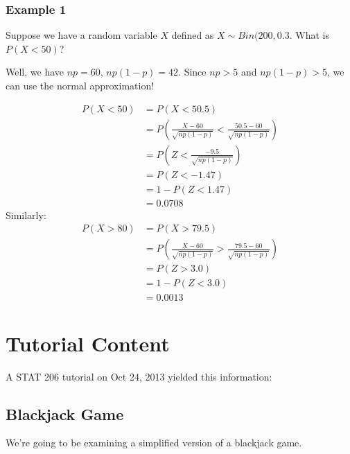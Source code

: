                 \subsubsection{Example 1} %
                \label{ssub:example_1}
                    Suppose we have a random variable $X$ defined as $X \sim Bin(200, 0.3$.
                    What is $P(X < 50)$?

                    Well, we have $np = 60$, $np (1-p) = 42$.
                    Since $np > 5$ and $np (1-p) > 5$, we can use the normal approximation!

                    \begin{align*}
                        P(X < 50) &= P(X < 50.5) \\
                        &= P(\frac{X - 60}{\sqrt{np (1 - p)}} < \frac{50.5 - 60}{\sqrt{np (1 - p)}}) \\
                        &= P(Z < \frac{-9.5}{\sqrt{np(1 - p)}}) \\
                        &= P(Z < - 1.47) \\
                        &= 1 - P (Z < 1.47) \\
                        &= 0.0708
                    \end{align*}
                    Similarly:
                    \begin{align*}
                        P(X > 80) &= P(X > 79.5) \\
                        &= P(\frac{X - 60}{\sqrt{np (1 - p)}} > \frac{79.5 - 60}{\sqrt{np (1 - p)}}) \\
                        &= P(Z > 3.0) \\
                        &= 1 - P(Z < 3.0) \\
                        &= 0.0013
                    \end{align*}
            \section{Tutorial Content} %
            \label{sec:tutorial_content}
                A STAT 206 tutorial on Oct 24, 2013 yielded this information:

                \subsection{Blackjack Game} %
                \label{sub:blackjack_game}
                    We're going to be examining a simplified version of a blackjack game.


